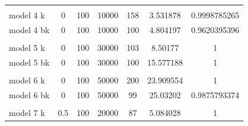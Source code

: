 \documentclass[submit]{harvardml}
\begin{document}
\begin{table}[htb]
\begin{tabular}{lcccccc}
		&                              &                            &                              &                             &                       &                      \\
		model 4 k                            & 0                            & 100                        & {\color[HTML]{3531FF} 10000} & 158                         & 3.531878              & 0.9998785265         \\
		model 4 bk                           & 0                            & 100                        & {\color[HTML]{3531FF} 10000} & 100                         & 4.804197              & 0.9620395396         \\
		&                              &                            &                              &                             &                       &                      \\
		model 5 k                            & 0                            & 100                        & {\color[HTML]{3166FF} 30000} & 103                         & 8.50177               & 1                    \\
		model 5 bk                           & 0                            & 100                        & {\color[HTML]{3166FF} 30000} & 100                         & 15.577188             & 1                    \\
		&                              &                            &                              &                             &                       &                      \\
		model 6 k                            & 0                            & 100                        & {\color[HTML]{3166FF} 50000} & 200                         & 23.909554             & 1                    \\
		model 6 bk                           & 0                            & 100                        & {\color[HTML]{3166FF} 50000} & 99                          & 25.03202              & 0.9875793374         \\
		&                              &                            &                              &                             &                       &                      \\
		model 7 k                            & {\color[HTML]{3166FF} 0.5}   & 100                        & 20000                        & 87                          & 5.084028              & 1                    \\

\end{tabular}
\end{table}
\end{document}

